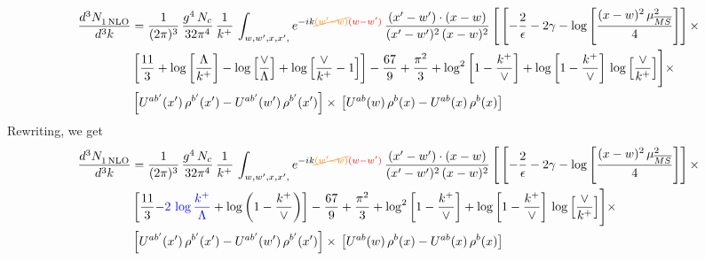 \documentclass[9pt]{article}
\numberwithin{equation}{section}
\begin{document}
\begin{align}
     \frac{d^{3}N_{1\,\rm NLO}^{\rm}}{d^{3}k} &  = \frac{1}{(2\pi)^{3}}\, \frac{g^{4}\,N_{c}}{32\pi^{4}}\,\frac{1}{k^{+}}\, \int_{w, w',x,x',} e^{-ik{\color{orange}\cancel{(w^\prime-w)}}{\color{red}(w-w^\prime)}}\, \frac{(x'-w')\cdot (x-w)}{(x'-w')^{2}\, (x-w)^{2}}\, \Bigg[\left[-\frac{2}{\epsilon}-2\gamma-\log{\left[\frac{(x-w)^{2}\,\mu^{2}_{\overline{MS}}}{4}\right]}\right]\times \notag \\ & \left[\frac{11}{3}+\log{\left[\frac{\Lambda}{k^{+}}\right]}-\log{\left[\frac{\vee}{\Lambda}\right]}+\log{\left[\frac{\vee}{k^{+}}-1\right]}\right]-\frac{67}{9}+\frac{\pi^{2}}{3}+\log^{2}{\left[1-\frac{k^{+}}{\vee}\right]}+\log{\left[1-\frac{k^{+}}{\vee}\right]}\,\log{\left[\frac{\vee}{k^{+}}\right]}\Bigg]\times\notag \\ & \left[U^{ab'}(x')\,\rho^{b'}(x') - U^{ab'}(w')\,\rho^{b'}(x')\right]\times\,\left[U^{ab}(w)\,\rho^{b}(x) - U^{ab}(x)\,\rho^{b}(x)\right]
\end{align}
Rewriting, we get
\begin{align}
     \frac{d^{3}N_{1\,\rm NLO}^{\rm}}{d^{3}k} &  = \frac{1}{(2\pi)^{3}}\, \frac{g^{4}\,N_{c}}{32\pi^{4}}\,\frac{1}{k^{+}}\, \int_{w, w',x,x',} e^{-ik{\color{orange}\cancel{(w^\prime-w)}}{\color{red}(w-w^\prime)}}\, \frac{(x'-w')\cdot (x-w)}{(x'-w')^{2}\, (x-w)^{2}}\, \Bigg[\left[-\frac{2}{\epsilon}-2\gamma-\log{\left[\frac{(x-w)^{2}\,\mu^{2}_{\overline{MS}}}{4}\right]}\right]\times \notag \\ & \left[\frac{11}{3}{\color{blue}-2\,\log\frac{k^{+}}{\Lambda}}+\log{\left(1-\frac{k^{+}}{\vee}\right)}\right]-\frac{67}{9}+\frac{\pi^{2}}{3}+\log^{2}{\left[1-\frac{k^{+}}{\vee}\right]}+\log{\left[1-\frac{k^{+}}{\vee}\right]}\,\log{\left[\frac{\vee}{k^{+}}\right]}\Bigg]\times\notag \\ & \left[U^{ab'}(x')\,\rho^{b'}(x') - U^{ab'}(w')\,\rho^{b'}(x')\right]\times\,\left[U^{ab}(w)\,\rho^{b}(x) - U^{ab}(x)\,\rho^{b}(x)\right]
\end{align}
\end{document}
